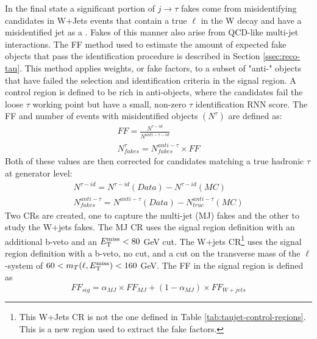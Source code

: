 		In the \taulep final state a significant portion of $j \to \tau$ fakes come from misidentifying \tauhad candidates in W+Jets events that contain a true $\ell$ in the W decay and have a misidentified jet as a \tauhad. Fakes of this manner also arise from \acrshort{QCD}-like multi-jet interactions. The \gls{FF} method used to estimate the amount of expected fake \tauhad objects that pass the \tauhad identification procedure is described in Section \ref{ssec:reco-tau}. This method applies weights, or fake factors, to a subset of "anti-\tauhad" objects that have failed the selection and identification criteria in the signal region. A control region is defined to be rich in anti-\tauhad objects, where the \tauhad candidates fail the loose $\tau$ working point but have a small, non-zero $\tau$ identification \gls{RNN} score. The \gls{FF} and number of events with misidentified \tauhad objects $(N^{\tau})$ are defined as:
		\begin{equation}\label{eqn:ff}\begin{split}
		FF = \frac{ N^{\tau-id} }{N^{anti-\tau-id}} \\
		N_{fakes}^{\tau} = N^{anti-\tau}_{fakes} \times FF
		\end{split}\end{equation}
		Both of these values are then corrected for \tauhad candidates matching a true hadronic $\tau$ at generator level:
		\begin{equation}\label{eqn:ff-corrected}\begin{split}
		N^{\tau-id} = N^{\tau-id}(Data) - N^{\tau-id}(MC) \\
		N^{anti-\tau}_{fakes} = N^{anti-\tau}(Data) - N^{anti-\tau}_{true} (MC)
		\end{split}\end{equation}
		Two \glspl{CR} are created, one to capture the multi-jet (MJ) fakes and the other to study the W+jets fakes. The MJ \gls{CR} uses the \taujets signal region definition with an additional b-veto and an $E_\text{T}^\text{miss} < 80$ GeV cut. The W+jets \gls{CR}\footnote{This W+Jets \gls{CR} is not the one defined in Table \ref{tab:taujet-control-regions}. This is a new region used to extract the fake factors.} uses the \taulep signal region definition with a b-veto, no \Etm cut, and a cut on the transverse mass of the $\ell$-\Etm system of $60 < m_{T}(\ell, E_\text{T}^\text{miss})<160$ GeV.
		The \gls{FF} in the signal region is defined as 
		\begin{equation}\label{eqn:ff-sig}
		FF_{sig} = \alpha_{MJ} \times FF_{MJ} + (1 - \alpha_{MJ}) \times FF_{W+jets}
		\end{equation}
